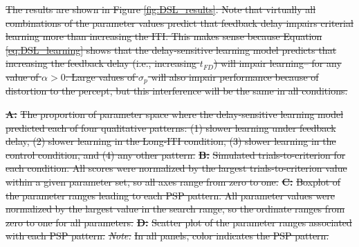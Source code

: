 \documentclass[doc, floatsintext]{apa7}
\providecommand{\DIFdel}[1]{{\protect\color{red}\sout{#1}}}                      %
\providecommand{\DIFdelbegin}{} %
\providecommand{\DIFdelFL}[1]{\DIFdel{#1}} %
\newcommand{\DIFscaledelfig}{0.5}
\newlength{\DIFdelgraphicswidth} %
\newlength{\DIFdelgraphicsheight} %
\newcommand{\DIFdelincludegraphics}[2][]{%
\sbox{\DIFdelgraphicsbox}{\DIFOincludegraphics[#1]{#2}}%
\settoboxwidth{\DIFdelgraphicswidth}{\DIFdelgraphicsbox} %
\settoboxtotalheight{\DIFdelgraphicsheight}{\DIFdelgraphicsbox} %
\scalebox{\DIFscaledelfig}{%
\parbox[b]{\DIFdelgraphicswidth}{\usebox{\DIFdelgraphicsbox}\\[-\baselineskip] \rule{\DIFdelgraphicswidth}{0em}}\llap{\resizebox{\DIFdelgraphicswidth}{\DIFdelgraphicsheight}{%
\setlength{\unitlength}{\DIFdelgraphicswidth}%
\begin{picture}(1,1)%
\thicklines\linethickness{2pt} %
{\color[rgb]{1,0,0}\put(0,0){\framebox(1,1){}}}%
{\color[rgb]{1,0,0}\put(0,0){\line( 1,1){1}}}%
{\color[rgb]{1,0,0}\put(0,1){\line(1,-1){1}}}%
\end{picture}%
}\hspace*{3pt}}} %
} %
\DeclareRobustCommand{\DIFdelbegin}{\DIFOdelbegin \let\includegraphics\DIFdelincludegraphics} %
\begin{document}
\DIFdelbegin \DIFdel{The results are shown in Figure \ref{fig:DSL_results}. Note
that virtually all combinations of the parameter values
predict that feedback delay impairs criterial learning more
than increasing the ITI. This makes sense because Equation
\ref{eq:DSL_learning} shows that the delay-sensitive
learning model predicts that increasing the feedback delay
(i.e., increasing $t_{FD}$) will impair learning-- for any
value of $\alpha>0$. Large values of $\sigma_p$ will also
impair performance because of distortion to the percept, but
this interference will be the same in all conditions.
}%

{%
\textbf{\DIFdelFL{A:}} %
\DIFdelFL{The proportion of parameter space where
      the delay-sensitive learning model predicted each of
      four qualitative patterns: (1) slower learning under
      feedback delay, (2) slower learning in the Long-ITI
      condition, (3) slower learning in the control
      condition, and (4) any other pattern. 
      }\textbf{\DIFdelFL{B:}} %
\DIFdelFL{Simulated trials-to-criterion for each
      condition. All scores were normalized by the largest
      trials-to-criterion value within a given parameter
      set, so all axes range from zero to one. 
      }\textbf{\DIFdelFL{C:}} %
\DIFdelFL{Boxplot of the parameter ranges leading to
      each PSP pattern. All parameter values were normalized
      by the largest value in the search range, so the
      ordinate ranges from zero to one for all parameters.
      }\textbf{\DIFdelFL{D:}} %
\DIFdelFL{Scatter plot of the parameter ranges
      associated with each PSP pattern. 
      }\textit{\DIFdelFL{Note:}} %
\DIFdelFL{In all panels, color indicates the PSP
      pattern.
}}
\end{document}
